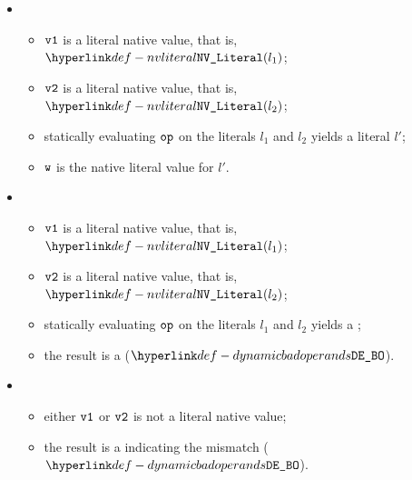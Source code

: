 \ProseParagraph
\OneApplies
\begin{itemize}
  \item {}
  \begin{itemize}
    \item $\vvone$ is a literal native value, that is, $\nvliteral{l_1}$;
    \item $\vvtwo$ is a literal native value, that is, $\nvliteral{l_2}$;
    \item statically evaluating $\op$ on the literals $l_1$ and $l_2$ yields a literal $l'$;
    \item $\vw$ is the native literal value for $l'$.
  \end{itemize}

  \item {}
  \begin{itemize}
    \item $\vvone$ is a literal native value, that is, $\nvliteral{l_1}$;
    \item $\vvtwo$ is a literal native value, that is, $\nvliteral{l_2}$;
    \item statically evaluating $\op$ on the literals $l_1$ and $l_2$ yields a \typingerrorterm{};
    \item the result is a \dynamicerrorterm{} ($\DynamicBadOperands$).
  \end{itemize}

  \item {}
  \begin{itemize}
    \item either $\vvone$ or $\vvtwo$ is not a literal native value;
    \item the result is a \dynamicerrorterm{} indicating the mismatch ($\DynamicBadOperands$).
  \end{itemize}
\end{itemize}

\FormallyParagraph
\begin{mathpar}
\end{mathpar}

\begin{mathpar}
\end{mathpar}

\begin{mathpar}
\end{mathpar}
